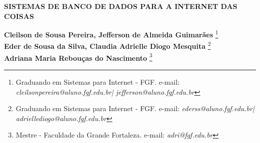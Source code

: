 \documentclass[12pt]{article}
\begin{document}

%



\begin{center}
\textbf{\Large{SISTEMAS DE BANCO DE DADOS PARA A INTERNET DAS COISAS}}\\
\end{center}

\vspace*{0.2cm}

\begin{flushright}
 {\bf Cleilson de Sousa Pereira, Jefferson de Almeida Guimarães} \footnote[1]{Graduando em Sistemas para Internet - FGF. e-mail: \it cleilsonpereira@aluno.fgf.edu.br\hbox      | jefferson@aluno.fgf.edu.br}  \\
  {\bf Eder de Sousa da Silva, Claudia Adrielle Diogo Mesquita} \footnote[2]{Graduando em Sistemas para Internet - FGF. e-mail: \it ederss@aluno.fgf.edu.br\hbox |
  adriellediogo@aluno.fgf.edu.br}  \\
  {\bf Adriana Maria Rebouças do Nascimento} \footnote[3]{Mestre - Faculdade da Grande Fortaleza. e-mail: \it adri@fgf.edu.br}   \\
\end{flushright}

\vspace*{0.5cm}

\end{document}
